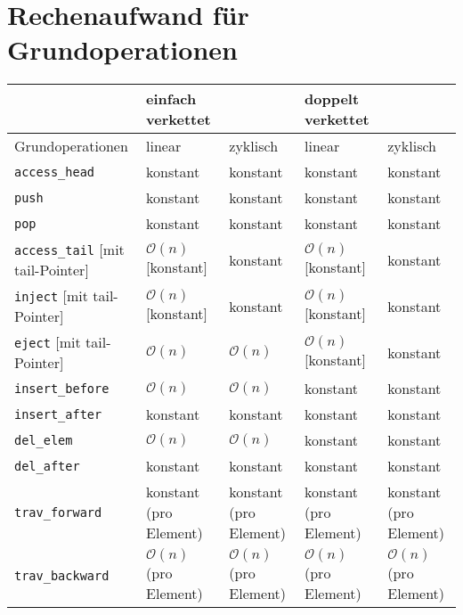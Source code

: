 \section{Rechenaufwand für Grundoperationen}

\begin{tabularx}{\textwidth}{p{}|p{}p{}|p{}p{}}
	 & einfach verkettet & & doppelt verkettet & \\
	 \hline
	 Grundoperationen & linear & zyklisch & linear & zyklisch \\
	 \hline\hline
	 \texttt{access\_head} & konstant & konstant & konstant & konstant \\
	 \hline
	 \texttt{push} & konstant & konstant & konstant & konstant \\
	 \hline
	 \texttt{pop} & konstant & konstant & konstant & konstant \\
	 \hline
	 \texttt{access\_tail} [mit tail-Pointer] & $\mathcal{O}(n)$ [konstant] & konstant & $\mathcal{O}(n)$ [konstant] & konstant \\
	 \hline
	 \texttt{inject} [mit tail-Pointer] & $\mathcal{O}(n)$ [konstant] & konstant & $\mathcal{O}(n)$ [konstant] & konstant \\
	 \hline
	 \texttt{eject} [mit tail-Pointer] & $\mathcal{O}(n)$ & $\mathcal{O}(n)$ & $\mathcal{O}(n)$ [konstant] & konstant \\
	 \hline
	 \texttt{insert\_before} & $\mathcal{O}(n)$ & $\mathcal{O}(n)$ & konstant & konstant \\
	 \hline
	 \texttt{insert\_after} & konstant & konstant & konstant & konstant \\
	 \hline
	 \texttt{del\_elem} & $\mathcal{O}(n)$ & $\mathcal{O}(n)$ & konstant & konstant \\
	 \hline
	 \texttt{del\_after} & konstant & konstant & konstant & konstant \\
	 \hline
	 \texttt{trav\_forward} & konstant (pro Element) & konstant (pro Element) & konstant (pro Element) & konstant (pro Element) \\
	 \hline
	 \texttt{trav\_backward} & $\mathcal{O}(n)$ (pro Element) & $\mathcal{O}(n)$ (pro Element) & $\mathcal{O}(n)$ (pro Element) & $\mathcal{O}(n)$ (pro Element) \\
\end{tabularx}